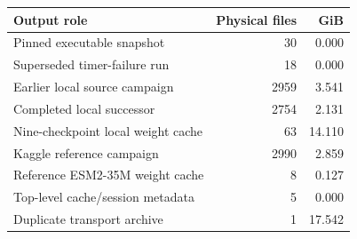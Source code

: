 
{\small\setlength{\tabcolsep}{4pt}
\begin{tabularx}{\textwidth}{Xrr}
\toprule
Output role & Physical files & GiB \\
\midrule
Pinned executable snapshot & 30 & 0.000 \\
Superseded timer-failure run & 18 & 0.000 \\
Earlier local source campaign & 2959 & 3.541 \\
Completed local successor & 2754 & 2.131 \\
Nine-checkpoint local weight cache & 63 & 14.110 \\
Kaggle reference campaign & 2990 & 2.859 \\
Reference ESM2-35M weight cache & 8 & 0.127 \\
Top-level cache/session metadata & 5 & 0.000 \\
Duplicate transport archive & 1 & 17.542 \\
\bottomrule
\end{tabularx}}
